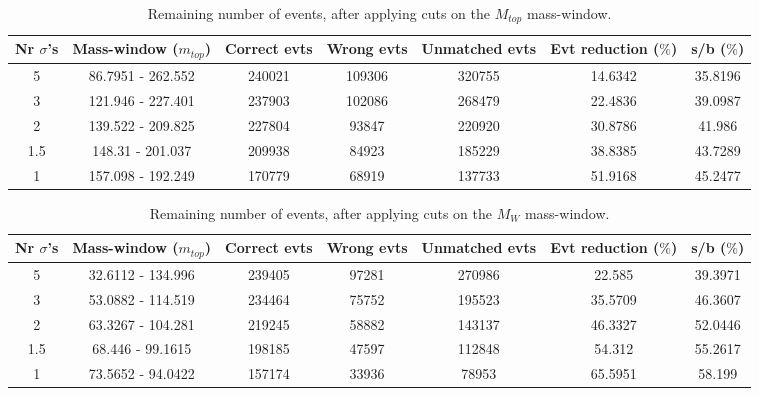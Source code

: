 \documentclass{article}
\begin{document}
 \begin{table}[h!t] 
  \caption{Remaining number of events, after applying cuts on the $M_{top}$ mass-window.} 
  \centering 
   \begin{tabular}{c|c|c|c|c|c|c} 
     Nr $\sigma$'s & Mass-window ($m_{top}$)    & Correct evts    & Wrong evts     & Unmatched evts   & Evt reduction ($\%$)    & s/b ($\%$)     \\ 
     \hline
     5 & 86.7951 - 262.552  &   240021  &  109306  &   320755 & 14.6342 &  35.8196 \\ 
     3 & 121.946 - 227.401  &   237903  &  102086  &   268479 & 22.4836 &  39.0987 \\ 
     2 & 139.522 - 209.825  &   227804  &  93847  &   220920 & 30.8786 &  41.986 \\ 
     1.5 & 148.31 - 201.037  &   209938  &  84923  &   185229 & 38.8385 &  43.7289 \\ 
     1 & 157.098 - 192.249  &   170779  &  68919  &   137733 & 51.9168 &  45.2477
   \end{tabular} 
 \end{table} 
 
 \begin{table}[h!t] 
  \caption{Remaining number of events, after applying cuts on the $M_{W}$ mass-window.} 
  \centering 
   \begin{tabular}{c|c|c|c|c|c|c} 
     Nr $\sigma$'s & Mass-window ($m_{top}$)    & Correct evts    & Wrong evts     & Unmatched evts   & Evt reduction ($\%$)    & s/b ($\%$)     \\ 
     \hline
     5 & 32.6112 - 134.996  &   239405  &  97281  &   270986 & 22.585 &  39.3971 \\ 
     3 & 53.0882 - 114.519  &   234464  &  75752  &   195523 & 35.5709 &  46.3607 \\ 
     2 & 63.3267 - 104.281  &   219245  &  58882  &   143137 & 46.3327 &  52.0446 \\ 
     1.5 & 68.446 - 99.1615  &   198185  &  47597  &   112848 & 54.312 &  55.2617 \\ 
     1 & 73.5652 - 94.0422  &   157174  &  33936  &   78953 & 65.5951 &  58.199
   \end{tabular} 
 \end{table} 
 
\end{document}
